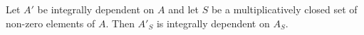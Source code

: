 Let $A'$ be integrally dependent on $A$ and let $S$ be a multiplicatively closed set of non-zero elements of $A$. Then $A'_S$ is integrally dependent on $A_S$.
